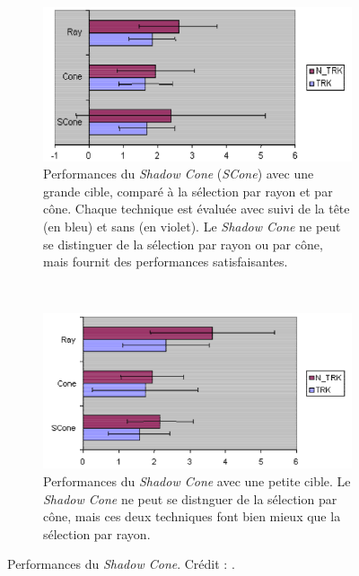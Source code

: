 	\begin{figure}[!htb]
		\begin{subfigure}[t]{0.49\textwidth}
			\centering
			\includegraphics[width=\textwidth]{figures/ch2/shadowSLarge}
			\caption{Performances du \emph{Shadow Cone} (\emph{SCone}) avec une grande cible, comparé à la sélection par rayon et par cône. Chaque technique est évaluée avec suivi de la tête (en bleu) et sans (en violet). Le \emph{Shadow Cone} ne peut se distinguer de la sélection par rayon ou par cône, mais fournit des performances satisfaisantes.}
			\label{fig:shadowSLarge}
		\end{subfigure}
		~
		\begin{subfigure}[t]{0.49\textwidth}
			\centering
			\includegraphics[width=\textwidth]{figures/ch2/shadowSSmall}
			\caption{Performances du \emph{Shadow Cone} avec une petite cible. Le \emph{Shadow Cone} ne peut se distnguer de la sélection par cône, mais ces deux techniques font bien mieux que la sélection par rayon.}
			\label{fig:shadowSSmall}
		\end{subfigure}
		\caption[Performances du \emph{Shadow Cone}]{Performances du \emph{Shadow Cone}. Crédit : \cite{steed20043d}.}
		\label{fig:shadowConePerf}
	\end{figure}
	
